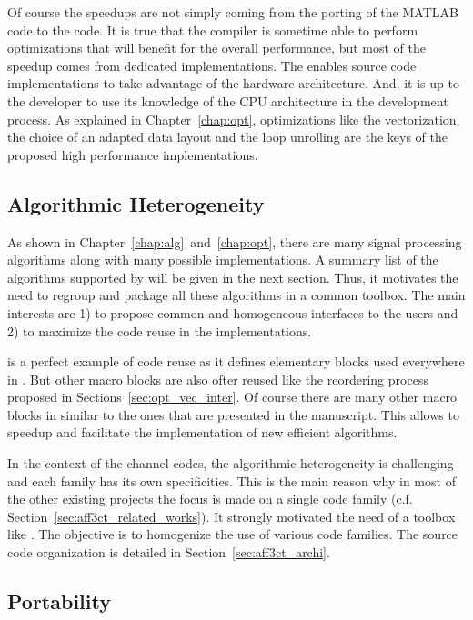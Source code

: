 Of course the speedups are not simply coming from the porting of the MATLAB
code to the \Cxx code. It is true that the compiler is sometime able to perform
optimizations that will benefit for the overall performance, but most of the
speedup comes from dedicated implementations. The \Cxx enables source code
implementations to take advantage of the hardware architecture. And, it is up
to the developer to use its knowledge of the CPU architecture in the development
process. As explained in Chapter~\ref{chap:opt}, optimizations like the
vectorization, the choice of an adapted data layout and the loop unrolling are
the keys of the proposed high performance implementations.

\subsection{Algorithmic Heterogeneity}

As shown in Chapter~\ref{chap:alg}~and~\ref{chap:opt}, there are many signal
processing algorithms along with many possible implementations. A summary list
of the algorithms supported by \AFFECT will be given in the next section. Thus,
it motivates the need to regroup and package all these algorithms in a common
toolbox. The main interests are 1) to propose common and homogeneous interfaces
to the users and 2) to maximize the code reuse in the implementations.

\MIPP is a perfect example of code reuse as it defines elementary blocks used
everywhere in \AFFECT. But other macro blocks are also ofter reused like the
reordering process proposed in Sections~\ref{sec:opt_vec_inter}. Of course there
are many other macro blocks in \AFFECT similar to the ones that are presented in
the manuscript. This allows to speedup and facilitate the implementation of new
efficient algorithms.

In the context of the channel codes, the algorithmic heterogeneity is
challenging and each family has its own specificities. This is the main reason
why in most of the other existing projects the focus is made on a single code
family (c.f. Section~\ref{sec:aff3ct_related_works}). It strongly motivated
the need of a toolbox like \AFFECT. The objective is to homogenize the use of
various code families. The \AFFECT source code organization is detailed in
Section~\ref{sec:aff3ct_archi}.

\subsection{Portability}

